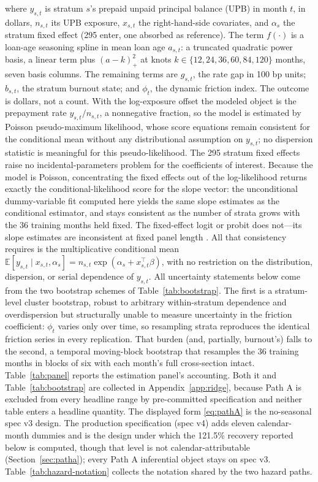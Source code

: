 \documentclass[12pt]{article}
\begin{document}
where $y_{s,t}$ is stratum $s$'s prepaid unpaid principal balance (UPB) in month $t$, in dollars, $n_{s,t}$ its UPB exposure, $x_{s,t}$ the right-hand-side covariates, and $\alpha_{s}$ the stratum fixed effect (295 enter, one absorbed as reference). The term $f(\cdot)$ is a loan-age seasoning spline in mean loan age $a_{s,t}$: a truncated quadratic power basis, a linear term plus $(a - k)_+^2$ at knots $k \in \{12, 24, 36, 60, 84, 120\}$ months, seven basis columns. The remaining terms are $g_{s,t}$, the rate gap in 100 bp units; $b_{s,t}$, the stratum burnout state; and $\phi_t$, the dynamic friction index. The outcome is dollars, not a count. With the log-exposure offset the modeled object is the prepayment rate $y_{s,t}/n_{s,t}$, a nonnegative fraction, so the model is estimated by Poisson pseudo-maximum likelihood, whose score equations remain consistent for the conditional mean without any distributional assumption on $y_{s,t}$; no dispersion statistic is meaningful for this pseudo-likelihood. The 295 stratum fixed effects raise no incidental-parameters problem for the coefficients of interest. Because the model is Poisson, concentrating the fixed effects out of the log-likelihood returns exactly the conditional-likelihood score for the slope vector: the unconditional dummy-variable fit computed here yields the same slope estimates as the conditional estimator, and stays consistent as the number of strata grows with the 36 training months held fixed. The fixed-effect logit or probit does not---its slope estimates are inconsistent at fixed panel length \citep{wooldridge1999}. All that consistency requires is the multiplicative conditional mean $\mathbb{E}[y_{s,t}\mid x_{s,t},\alpha_{s}] = n_{s,t}\exp(\alpha_{s} + x_{s,t}^{\top}\beta)$, with no restriction on the distribution, dispersion, or serial dependence of $y_{s,t}$. All uncertainty statements below come from the two bootstrap schemes of Table~\ref{tab:bootstrap}. The first is a stratum-level cluster bootstrap, robust to arbitrary within-stratum dependence and overdispersion but structurally unable to measure uncertainty in the friction coefficient: $\phi_t$ varies only over time, so resampling strata reproduces the identical friction series in every replication. That burden (and, partially, burnout's) falls to the second, a temporal moving-block bootstrap that resamples the 36 training months in blocks of six with each month's full cross-section intact. Table~\ref{tab:panel} reports the estimation panel's accounting. Both it and Table~\ref{tab:bootstrap} are collected in Appendix~\ref{app:ridge}, because Path A is excluded from every headline range by pre-committed specification and neither table enters a headline quantity. The displayed form \eqref{eq:pathA} is the no-seasonal spec v3 design. The production specification (spec v4) adds eleven calendar-month dummies and is the design under which the 121.5\% recovery reported below is computed, though that level is not calendar-attributable (Section~\ref{sec:patha}); every Path A inferential object stays on spec v3. Table~\ref{tab:hazard-notation} collects the notation shared by the two hazard paths.
\end{document}
